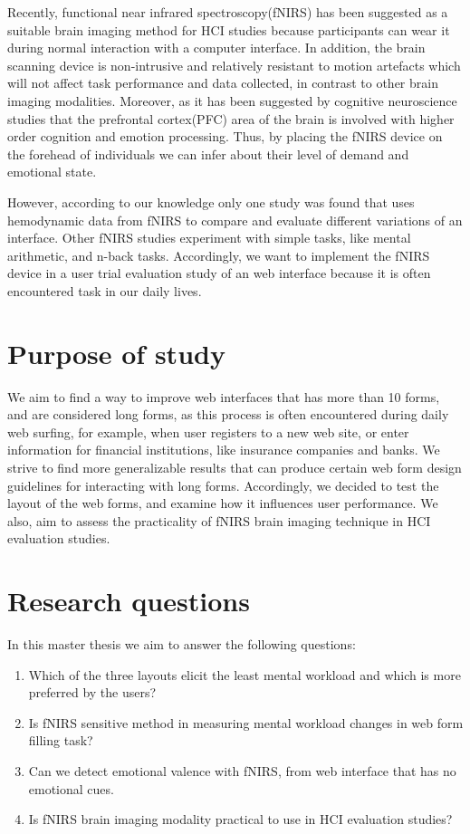 \documentclass[a4paper]{report}
\begin{document}
	Recently, functional near infrared spectroscopy(fNIRS) has been suggested as a suitable brain imaging method for HCI studies\cite{maior2015examining,solovey2009using,pike2014measuring} because participants can wear it during normal interaction with a computer interface. In addition, the brain scanning device is non-intrusive and relatively resistant to motion artefacts which will not affect task performance and data collected, in contrast to other brain imaging modalities. Moreover, as it has been suggested by cognitive neuroscience studies that the prefrontal cortex(PFC) area of the brain is involved with higher order cognition\cite{braver1997parametric} and emotion processing\cite{damasio1996somatic}. Thus, by placing the fNIRS device on the forehead of individuals we can infer about their level of demand and emotional state.
	
	However, according to our knowledge only one study was found\cite{peck2013using} that uses hemodynamic data from fNIRS to compare and evaluate different variations of an interface. Other fNIRS studies experiment with simple tasks, like mental arithmetic, and n-back tasks. Accordingly, we want to implement the fNIRS device in a user trial evaluation study of an web interface because it is often encountered task in our daily lives. 
	
	\section{Purpose of study}
		 We aim to find a way to improve web interfaces that has more than 10 forms, and are considered long forms, as this process is often encountered during daily web surfing, for example, when user registers to a new web site, or enter information for financial institutions, like insurance companies and banks. We strive to find more generalizable results that can produce certain web form design guidelines for interacting with long forms. Accordingly, we decided to test the layout of the web forms, and examine how it influences user performance. We also, aim to assess the practicality of fNIRS brain imaging technique in HCI evaluation studies.
	\section{Research questions}
		In this master thesis we aim to answer the following questions:
		\begin{enumerate}
			\itemsep0em
			\item Which of the three layouts elicit the least mental workload and which is more preferred by the users?
			\item Is fNIRS sensitive method in measuring mental workload changes in web form filling task? 
			\item Can we detect emotional valence with fNIRS, from web interface that has no emotional cues.
			\item Is fNIRS brain imaging modality practical to use in HCI evaluation studies?
		\end{enumerate}		
\end{document}
